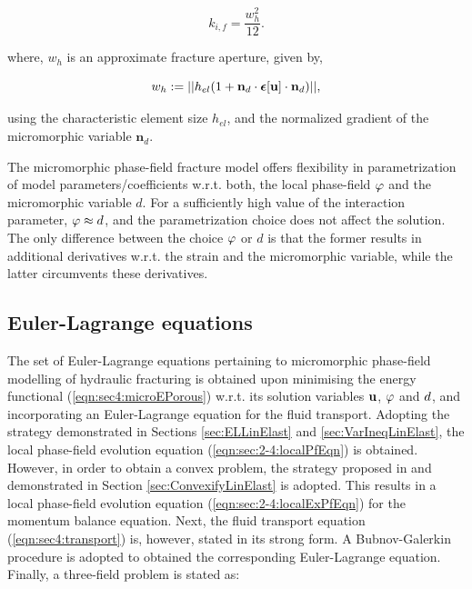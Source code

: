 \documentclass[11pt]{article}
\begin{document}
\begin{equation}
k_{i,f} = \dfrac{w_h^2}{12}.
\end{equation}

where, $w_h$ is an approximate fracture aperture, given by,

\begin{equation}
w_h := || h_{el} ( 1 + \mathbf{n}_{d} \cdot \hbox{$\hbox{\boldmath$\epsilon$}$}[\hbox{$\mathbf{u}$}] \cdot \mathbf{n}_{d} ) ||,
\end{equation}

using the characteristic element size $h_{el}$, and the normalized gradient of the micromorphic variable $\mathbf{n}_{d}$.

\begin{remark}
The micromorphic phase-field fracture model offers flexibility in parametrization of model parameters/coefficients w.r.t. both, the local phase-field $\hbox{$\varphi$}$ and the micromorphic variable $d$. For a sufficiently high value of the interaction parameter, $\hbox{$\varphi$} \approx d$, and the parametrization choice does not affect the solution. The only difference between the choice $\hbox{$\varphi$}$ or $d$ is that the former results in additional derivatives w.r.t. the strain and the micromorphic variable, while the latter circumvents these derivatives. 
\end{remark}

\subsection{Euler-Lagrange equations}\label{sec:ELPorous}

The set of Euler-Lagrange equations pertaining to micromorphic phase-field modelling of hydraulic fracturing is obtained upon minimising the energy functional (\ref{eqn:sec4:microEPorous}) w.r.t. its solution variables $\hbox{$\mathbf{u}$}$, $\hbox{$\varphi$}$ and $\hbox{$d$}$, and incorporating an Euler-Lagrange equation for the fluid transport. Adopting the strategy demonstrated in Sections  \ref{sec:ELLinElast} and \ref{sec:VarIneqLinElast}, the local phase-field evolution equation (\ref{eqn:sec:2-4:localPfEqn}) is obtained. However, in order to obtain a convex problem, the strategy proposed in \cite{Heister2015} and demonstrated in Section \ref{sec:ConvexifyLinElast} is adopted. This results in a local phase-field evolution equation (\ref{eqn:sec:2-4:localExPfEqn}) for the momentum balance equation. Next, the fluid transport equation  (\ref{eqn:sec4:transport}) is, however, stated in its strong form. A Bubnov-Galerkin procedure is adopted to obtained the corresponding Euler-Lagrange equation. Finally, a three-field problem is stated as:
\end{document}
